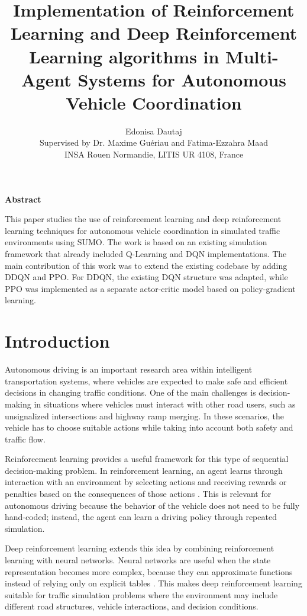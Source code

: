 \documentclass{article}
\title{Implementation of Reinforcement Learning and Deep Reinforcement
Learning algorithms in Multi-Agent Systems for Autonomous Vehicle
Coordination}
\author{
Edonisa Dautaj\\[0.2cm]
Supervised by Dr. Maxime Guériau and Fatima-Ezzahra Maad\\
\small INSA Rouen Normandie, LITIS UR 4108, France
}
\begin{document}
\maketitle

\begin{center}
\textbf{Abstract}
\end{center}

\noindent
This paper studies the use of reinforcement learning and deep reinforcement learning techniques for autonomous vehicle coordination in simulated traffic environments using SUMO. The work is based on an existing simulation framework that already included Q-Learning and DQN implementations. The main contribution of this work was to extend the existing codebase by adding DDQN and PPO. For DDQN, the existing DQN structure was adapted, while PPO was implemented as a separate actor-critic model based on policy-gradient learning.

\section{Introduction}

Autonomous driving is an important research area within intelligent transportation systems, where vehicles are expected to make safe and efficient decisions in changing traffic conditions. One of the main challenges is decision-making in situations where vehicles must interact with other road users, such as unsignalized intersections and highway ramp merging. In these scenarios, the vehicle has to choose suitable actions while taking into account both safety and traffic flow.

Reinforcement learning provides a useful framework for this type of sequential decision-making problem. In reinforcement learning, an agent learns through interaction with an environment by selecting actions and receiving rewards or penalties based on the consequences of those actions \cite{sutton2018reinforcement}. This is relevant for autonomous driving because the behavior of the vehicle does not need to be fully hand-coded; instead, the agent can learn a driving policy through repeated simulation.

Deep reinforcement learning extends this idea by combining reinforcement learning with neural networks. Neural networks are useful when the state representation becomes more complex, because they can approximate functions instead of relying only on explicit tables \cite{goodfellow2016deep}. This makes deep reinforcement learning suitable for traffic simulation problems where the environment may include different road structures, vehicle interactions, and decision conditions.
\end{document}
